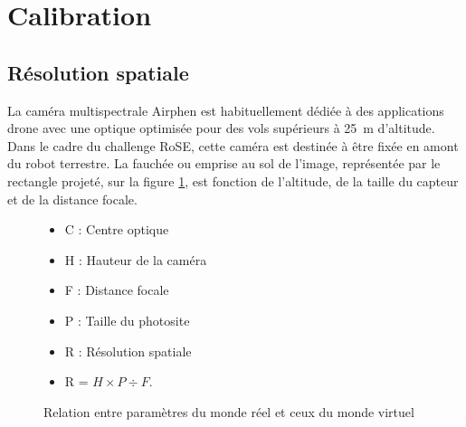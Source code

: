 \documentclass[../thesis.tex]{subfiles}
\begin{document}
    \newpage
    \section{Calibration}
    
    \subsection{Résolution spatiale}
    
    La caméra multispectrale Airphen est habituellement dédiée à des applications drone avec une optique optimisée pour des vols supérieurs à \SI{25}{m} d'altitude. Dans le cadre du challenge RoSE, cette caméra est destinée à être fixée en amont du robot terrestre. La fauchée ou emprise au sol de l'image, représentée par le rectangle projeté, sur la figure \ref{fig:04-camera-distance-sol}, est fonction de l'altitude, de la taille du capteur et de la distance focale.
    
    \vfill
    \begin{figure}[H]
        \centering
        \begin{minipage}[b]{0.60\linewidth}
            \centering
            
        \end{minipage}%
        \hspace{-1cm}
        \begin{minipage}[b]{0.35\linewidth}
            \centering
            \noindent
            \begin{itemize}
                \item C : Centre optique
                \item H : Hauteur de la caméra
                \item F : Distance focale
                \item P : Taille du photosite
                \item R : Résolution spatiale
                \item R = ${H} \times P \div F$.
            \end{itemize}
            \vspace{2cm}
        \end{minipage}%
        \caption{Relation entre paramètres du monde réel et ceux du monde virtuel}
        \label{fig:04-camera-distance-sol}
    \end{figure}
    \vfill
    
\end{document}

